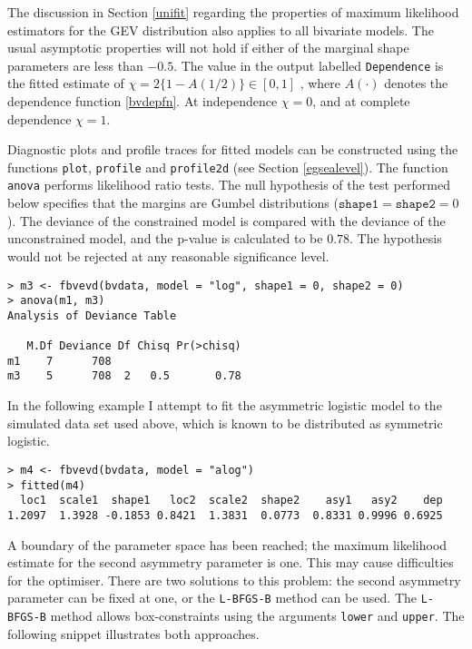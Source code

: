 \documentclass[11pt,a4paper]{article}
\begin{document}
The discussion in Section \ref{unifit} regarding the properties of maximum likelihood estimators for the GEV distribution also applies to all bivariate models.
The usual asymptotic properties will not hold if either of the marginal shape parameters are less than $-0.5$.
The value in the output labelled \verb+Dependence+ is the fitted estimate of $\chi = 2\{1-A(1/2)\} \in [0,1]$ \citep{coleheff99}, where $A(\cdot)$ denotes the dependence function \eqref{bvdepfn}. At independence $\chi = 0$, and at complete dependence $\chi = 1$.

Diagnostic plots and profile traces for fitted models can be constructed using the functions \verb+plot+, \verb+profile+ and \verb+profile2d+ (see Section \ref{egsealevel}).
The function \verb+anova+ performs likelihood ratio tests.
The null hypothesis of the test performed below specifies that the margins are Gumbel distributions ($\texttt{shape1} = \texttt{shape2} = 0$).
The deviance of the constrained model is compared with the deviance of the unconstrained model, and the p-value is calculated to be $0.78$.
The hypothesis would not be rejected at any reasonable significance level.

\begin{verbatim}
> m3 <- fbvevd(bvdata, model = "log", shape1 = 0, shape2 = 0)
> anova(m1, m3)
Analysis of Deviance Table

   M.Df Deviance Df Chisq Pr(>chisq)
m1    7      708                    
m3    5      708  2   0.5       0.78
\end{verbatim}

In the following example I attempt to fit the asymmetric logistic model to the simulated data set used above, which is known to be distributed as symmetric logistic. 

\begin{verbatim}
> m4 <- fbvevd(bvdata, model = "alog")
> fitted(m4)
  loc1  scale1  shape1   loc2  scale2  shape2    asy1   asy2    dep
1.2097  1.3928 -0.1853 0.8421  1.3831  0.0773  0.8331 0.9996 0.6925 
\end{verbatim}

A boundary of the parameter space has been reached; the maximum likelihood estimate for the second asymmetry parameter is one.
This may cause difficulties for the optimiser.
There are two solutions to this problem: the second asymmetry parameter can be fixed at one, or the \verb+L-BFGS-B+ method can be used.
The \verb+L-BFGS-B+ method allows box-constraints using the arguments \verb+lower+ and \verb+upper+. 
The following snippet illustrates both approaches. 
\end{document}

